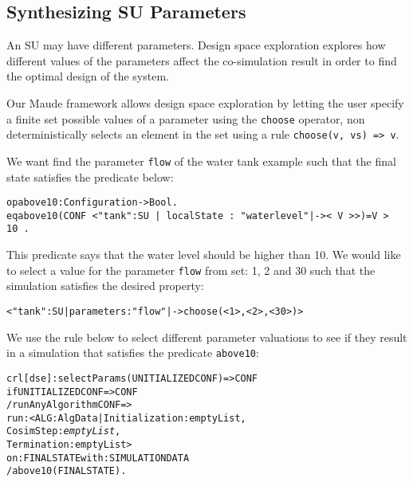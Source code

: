 \subsection{Synthesizing SU Parameters}
An SU may have different parameters.
Design space exploration explores how different values of the parameters affect the co-simulation result in order to find the optimal design of the system. 

Our Maude framework allows design space exploration by letting the user specify a finite set possible values of a parameter using the \texttt{choose} operator, non deterministically selects an element in the set using a rule \texttt{choose(v, vs) => v}.

\begin{example}\label{ex:dse}
  We want find the parameter \texttt{flow} of the water tank example such that the final state satisfies the predicate below:

  \small
  \begin{alltt}
op above10 : Configuration -> Bool .
eq above10(CONF\,< "tank" : SU\,|\,localState\,:\,"waterlevel" |-> <\,V\,> >) = V\,>\,10\,.  
  \end{alltt}
  \normalsize

  \noindent This predicate says that the water level should be higher than 10.
We would like to select a value for the parameter \texttt{flow} from set: 1, 2 and 30 such that the simulation satisfies the desired property:

\small
\begin{alltt}
< "tank" : SU | parameters : "flow" |-> choose(< 1 >,< 2 >,< 30 >) >
\end{alltt}
\normalsize

We use the rule below to select different parameter valuations to see if they result in a simulation that satisfies the predicate \texttt{above10}:

\small
\begin{alltt}
  crl [dse] : selectParams(UNITIALIZEDCONF) => CONF 
  if UNITIALIZEDCONF => CONF
  / runAnyAlgorithm CONF => 
           run: < ALG : AlgData | Initialization : emptyList, 
                                  CosimStep : \emph{emptyList}, 
                                  Termination : emptyList > 
           on: FINALSTATE with: SIMULATIONDATA
  / above10(FINALSTATE) .
\end{alltt}
\normalsize


\end{example}

